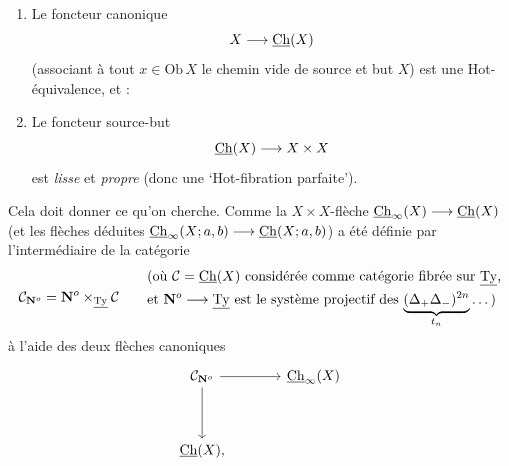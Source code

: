 \begin{enumerate}
\item[1)] Le foncteur canonique
\[
X \longrightarrow \underline{\mathrm{Ch}}(X)
\]
(associant à tout $x \in \mathrm{Ob}\,X$ le chemin vide de source et but $X$) est une Hot-équivalence, et : %
\item[2)] Le foncteur source-but
\[
\underline{\mathrm{Ch}}(X) \longrightarrow X \times X
\]
est \textit{lisse} et \textit{propre} (donc une `Hot-fibration parfaite').
\end{enumerate}

Cela doit donner ce qu'on cherche. Comme la $X \times X$-flèche $\underline{\mathrm{Ch}}_\infty(X) \longrightarrow \underline{\mathrm{Ch}}(X)$ (et les flèches déduites $\underline{\mathrm{Ch}}_\infty(X;a,b) \longrightarrow \underline{\mathrm{Ch}}(X;a,b)$) a été définie par l'intermédiaire de la catégorie
\[
\mathcal{C}_{\mathbf{N}^o} = \mathbf{N}^o \times_{\underline{\mathrm{Ty}}} \mathcal{C}
\qquad
\begin{aligned}
&\text{(où $\mathcal{C} = \underline{\mathrm{Ch}}(X)$ considérée comme catégorie fibrée sur $\underline{\mathrm{Ty}}$,}\\
&\text{et $\mathbf{N}^o \longrightarrow \underline{\mathrm{Ty}}$ est le système projectif des $\underbrace{(\Delta_+\Delta_-)^{2n}}_{t_n} \dots$)}
\end{aligned}
\]
à l'aide des deux flèches canoniques
\[
\begin{tikzcd}[row sep=huge, column sep=large]
\mathcal{C}_{\mathbf{N}^o} \arrow[r] \arrow[d] & \Ch_\infty(X) \\
\Ch(X), &
\end{tikzcd}
\]

